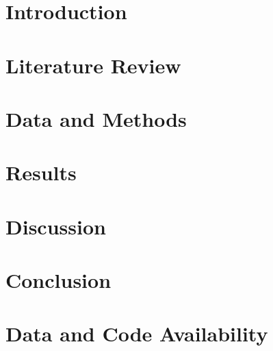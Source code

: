 \documentclass{article}
\begin{document}
\section{Introduction}


\section{Literature Review}


\section{Data and Methods}




\section{Results}


\section{Discussion}


\section{Conclusion}




\section*{Data and Code Availability}




\printbibliography
\end{document}

